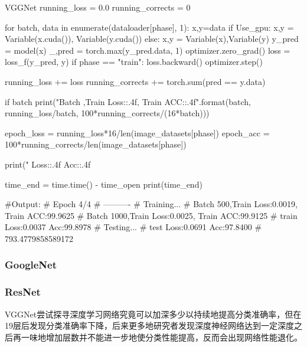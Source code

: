 \documentclass[openbib]{article}
\begin{document}
\begin{Python}{VGGNet}
	running_loss = 0.0
	running_corrects = 0
	
	for batch, data in enumerate(dataloader[phase], 1):
	x,y=data
	if Use_gpu:
	x,y = Variable(x.cuda()), Variable(y.cuda())
	else:
	x,y = Variable(x),Variable(y)
	y_pred = model(x)
	_,pred = torch.max(y_pred.data, 1)
	optimizer.zero_grad()
	loss = loss_f(y_pred, y)
	if phase == "train":
	loss.backward()
	optimizer.step()
	
	running_loss += loss
	running_corrects += torch.sum(pred == y.data)
	
	if batch%
	print("Batch {},Train Loss:{:.4f}, Train ACC:{:.4f}".format(batch, running_loss/batch,
	100*running_corrects/(16*batch)))
	
	epoch_loss = running_loss*16/len(image_datasets[phase])
	epoch_acc = 100*running_corrects/len(image_datasets[phase])
	
	print("{} Loss:{:.4f} Acc:{:.4f}%
	
	time_end = time.time() - time_open
	print(time_end)
	
	#Output:
	#		Epoch 4/4
	#		----------
	#		Training...
	#		Batch 500,Train Loss:0.0019, Train ACC:99.9625
	#		Batch 1000,Train Loss:0.0025, Train ACC:99.9125
	#		train Loss:0.0037 Acc:99.8978%
	#		Testing...
	#		test Loss:0.0691 Acc:97.8400%
	#		793.4779858589172
	
\end{Python}
\subsubsection{GoogleNet}

\subsubsection{ResNet}
VGGNet尝试探寻深度学习网络究竟可以加深多少以持续地提高分类准确率，但在19层后发现分类准确率下降，后来更多地研究者发现深度神经网络达到一定深度之后再一味地增加层数并不能进一步地使分类性能提高，反而会出现网络性能退化。
\end{document}
